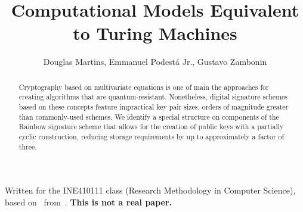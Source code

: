 \documentclass[12pt]{article}
\title{Computational Models Equivalent to Turing Machines}
\author{Douglas Martins\inst{1}, Emmanuel Podestá Jr.\inst{1}, Gustavo Zambonin\inst{1}}
\begin{document}
 

\maketitle

\begin{abstract}
Cryptography based on multivariate equations is one of main the approaches for creating algorithms that are quantum-resistant. Nonetheless, digital signature schemes based on these concepts feature impractical key pair sizes, orders of magnitude greater than commonly-used schemes. We identify a special structure on components of the Rainbow signature scheme that allows for the creation of public keys with a partially cyclic construction, reducing storage requirements by up to approximately a factor of three.
\end{abstract}

Written for the INE410111 class (Research Methodology in Computer Science), based on~\cite{Petzoldt:inproc:2010:dec} from~\cite{Petzoldt:phd:2013:jul}. \textbf{This is not a real paper.}



\end{document}

